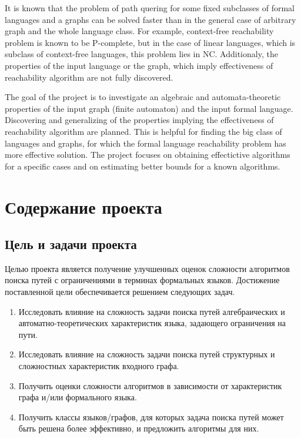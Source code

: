 \documentclass[12pt]{article}  %
\theoremstyle{remark}
\begin{document}
It is known that the problem of path quering for some fixed subclasses of formal languages and a graphs can be solved faster than in the general case of arbitrary graph and the whole language class. For example, context-free reachability problem is known to be P-complete, but in the case of linear languages, which is subclass of context-free languages, this problem lies in NC. Additionaly, the properties of the input language or the graph, which imply effectiveness of reachability algorithm are not fully discovered.

The goal of the project is to investigate an algebraic and automata-theoretic properties of the input graph (finite automaton) and the input formal language. Discovering and generalizing of the properties implying the effectiveness of reachability algorithm are planned. This is helpful for finding the big class of languages and graphs, for which the formal language reachability problem has more effective solution. The project focuses on obtaining effectictive algorithms for a specific cases and on estimating better bounds for a known algorithms.


\section{Содержание проекта}

\subsection{Цель и задачи проекта}
Целью проекта является  получение улучшенных оценок сложности алгоритмов поиска путей с ограничениями в терминах формальных языков.
Достижение поставленной цели обеспечивается решением следующих задач.

\begin{enumerate}
\item Исследовать влияние на сложность задачи поиска путей алгебраических и автоматно-теоретических характеристик языка, задающего ограничения на пути.
\item Исследовать влияние на сложность задачи поиска путей структурных и сложностных характеристик входного графа.
\item Получить оценки сложности алгоритмов в зависимости от характеристик графа и/или формального языка.
\item Получить классы языков/графов, для которых задача поиска путей может быть решена более эффективно, и предложить алгоритмы для них.
\end{enumerate}
\end{document}
